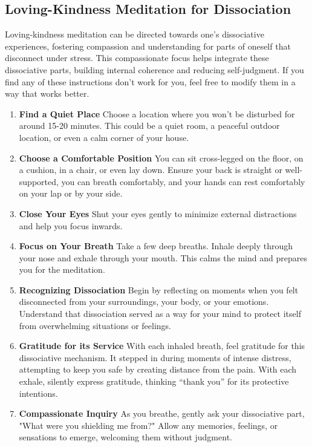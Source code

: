 \documentclass[12pt,letterpaper]{article}
\begin{document}
\subsection{Loving-Kindness Meditation for Dissociation}
\label{lkmeditation}
Loving-kindness meditation can be directed towards one's dissociative experiences, fostering compassion and understanding for parts of oneself that disconnect under stress. This compassionate focus helps integrate these dissociative parts, building internal coherence and reducing self-judgment. If you find any of these instructions don't work for you, feel free to modify them in a way that works better. 
\begin{enumerate}
    \item \textbf{Find a Quiet Place} Choose a location where you won't be disturbed for around 15-20 minutes. This could be a quiet room, a peaceful outdoor location, or even a calm corner of your house.
    \item \textbf{Choose a Comfortable Position} You can sit cross-legged on the floor, on a cushion, in a chair, or even lay down. Ensure your back is straight or well-supported, you can breath comfortably, and your hands can rest comfortably on your lap or by your side.
    \item \textbf{Close Your Eyes} Shut your eyes gently to minimize external distractions and help you focus inwards.
    \item \textbf{Focus on Your Breath} Take a few deep breaths. Inhale deeply through your nose and exhale through your mouth. This calms the mind and prepares you for the meditation.
    \item \textbf{Recognizing Dissociation} Begin by reflecting on moments when you felt disconnected from your surroundings, your body, or your emotions. Understand that dissociation served as a way for your mind to protect itself from overwhelming situations or feelings.
    \item \textbf{Gratitude for its Service} With each inhaled breath, feel gratitude for this dissociative mechanism. It stepped in during moments of intense distress, attempting to keep you safe by creating distance from the pain. With each exhale, silently express gratitude, thinking “thank you” for its protective intentions.
    \item \textbf{Compassionate Inquiry} As you breathe, gently ask your dissociative part, "What were you shielding me from?" Allow any memories, feelings, or sensations to emerge, welcoming them without judgment.

\end{enumerate}
\end{document}
